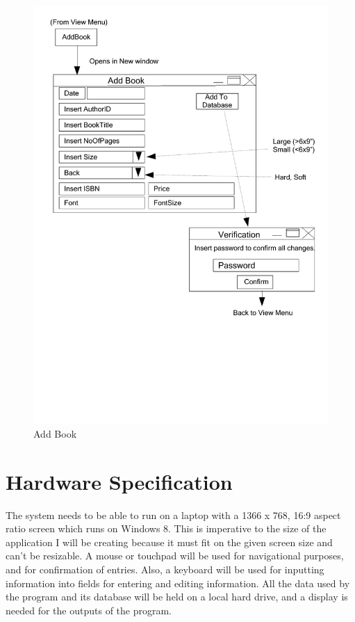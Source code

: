 \begin{figure}[H]
    \caption{Add Book} \label{AddBook.pdf}
    \includegraphics[width=\textwidth]{./Design/UserInterfaceDesign/AddBook.pdf}
\end{figure}

\section{Hardware Specification}

The system needs to be able to run on a laptop with a 1366 x 768, 16:9 aspect ratio screen which runs on Windows 8. This is imperative to the size of the application I will be creating because it must fit on the given screen size and can't be resizable. A mouse or touchpad will be used for navigational purposes, and for confirmation of entries. Also, a keyboard will be used for inputting information into fields for entering and editing information. All the data used by the program and its database will be held on a local hard drive, and a display is needed for the outputs of the program.

